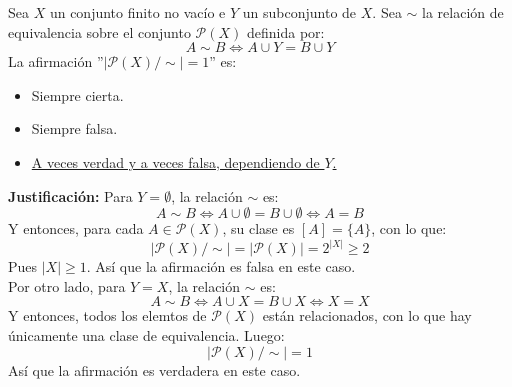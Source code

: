\documentclass[12pt]{article}
\newcounter{ejercicio}[section] %
\newcounter{ejercicio}
\begin{document}
    \begin{ejercicio}
        Sea $X$ un conjunto finito no vacío e $Y$ un subconjunto de $X$. Sea $\sim$ la relación de equivalencia sobre el conjunto $\mathcal{P}(X)$ definida por:
        $$A \sim B \Leftrightarrow A \cup Y = B \cup Y$$
        La afirmación ''$|\mathcal{P}(X)/\sim|=1$'' es:
        \begin{itemize}
            \item Siempre cierta.
            \item Siempre falsa.
            \item \underline{A veces verdad y a veces falsa, dependiendo de $Y$.}
        \end{itemize}
        \textbf{Justificación:}\newline
        Para $Y = \emptyset$, la relación $\sim$ es:
        $$A \sim B \Leftrightarrow A \cup \emptyset = B \cup \emptyset \Leftrightarrow A = B$$
        Y entonces, para cada $A \in \mathcal{P}(X)$, su clase es $[A] = \{A\}$, con lo que:
        $$|\mathcal{P}(X)/\sim| = |\mathcal{P}(X)| = 2^{|X|} \geq 2$$
        Pues $|X| \geq 1$. Así que la afirmación es falsa en este caso.\\

        \noindent
        Por otro lado, para $Y=X$, la relación $\sim$ es:
        $$A \sim B \Leftrightarrow A \cup X = B \cup X \Leftrightarrow X = X$$
        Y entonces, todos los elemtos de $\mathcal{P}(X)$ están relacionados, con lo que hay únicamente una clase de equivalencia. Luego:
        $$|\mathcal{P}(X)/\sim| =1$$
        Así que la afirmación es verdadera en este caso.
    \end{ejercicio}
\end{document}
